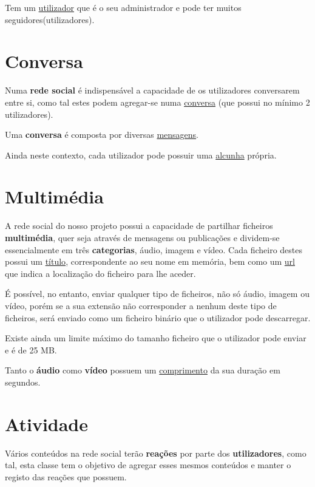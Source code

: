 \documentclass[12pt]{report}
\begin{document}
Tem um \underline{utilizador} que é o seu administrador e pode ter muitos seguidores(utilizadores).

\section{Conversa}

Numa \textbf{rede social} é indispensável a capacidade de os utilizadores conversarem entre si, como tal estes podem agregar-se numa \underline{conversa} (que possui no mínimo 2 utilizadores). \par

Uma \textbf{conversa} é composta por diversas \underline{mensagens}. \par

Ainda neste contexto, cada utilizador pode possuir uma \underline{alcunha} própria.

\section{Multimédia}

A rede social do nosso projeto possui a capacidade de partilhar ficheiros \textbf{multimédia}, quer seja através de mensagens ou publicações e dividem-se essencialmente em três \textbf{categorias}, áudio, imagem e vídeo. Cada ficheiro destes possui um \underline{título}, correspondente ao seu nome em memória, bem como um \underline{url} que indica a localização do ficheiro para lhe aceder. \par

É possível, no entanto, enviar qualquer tipo de ficheiros, não só áudio, imagem ou vídeo, porém se a sua extensão não corresponder a nenhum deste tipo de ficheiros, será enviado como um ficheiro binário que o utilizador pode descarregar. \par

Existe ainda um limite máximo do tamanho ficheiro que o utilizador pode enviar e é de 25 MB. \par

Tanto o \textbf{áudio} como \textbf{vídeo} possuem um \underline{comprimento} da sua duração em segundos.

\section{Atividade}

Vários conteúdos na rede social terão \textbf{reações} por parte dos \textbf{utilizadores}, como tal, esta classe tem o objetivo de agregar esses mesmos conteúdos e manter o registo das reações que possuem. \par
\end{document}
